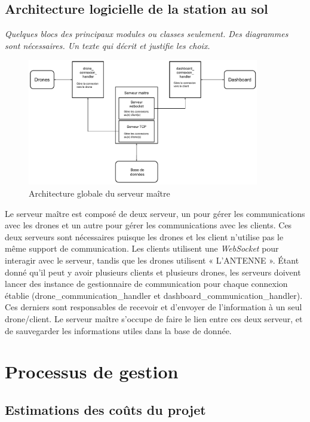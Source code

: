 \documentclass{mistcoursedoc}
\begin{document}
\newpage\subsection{Architecture logicielle de la station au sol}

\textit{Quelques blocs des principaux modules ou classes seulement.  Des diagrammes sont nécessaires.  Un texte qui décrit et justifie les choix.}

\begin{figure}[h!]
  \centering\includegraphics[width=0.9\textwidth]{architecture-serveur.pdf}
  \caption{Architecture globale du serveur maître}
\end{figure}

Le serveur maître est composé de deux serveur, un pour gérer les communications avec les drones et un autre pour gérer les communications avec les clients. Ces deux serveurs sont nécessaires puisque les drones et les client n’utilise pas le même support de communication. Les clients utilisent une \emph{WebSocket} pour interagir avec le serveur, tandis que les drones utilisent « L'ANTENNE ». Étant donné qu'il peut y avoir plusieurs clients et plusieurs drones, les serveurs doivent lancer des instance de gestionnaire de communication pour chaque connexion établie (drone\_communication\_handler et dashboard\_communication\_handler). Ces derniers sont responsables de recevoir et d’envoyer de l’information à un seul drone/client. Le serveur maître s'occupe de faire le lien entre ces deux serveur, et de sauvegarder les informations utiles dans la base de donnée.

\newpage
\section{Processus de gestion}

\subsection{Estimations des coûts du projet}\label{coûts}
\end{document}

